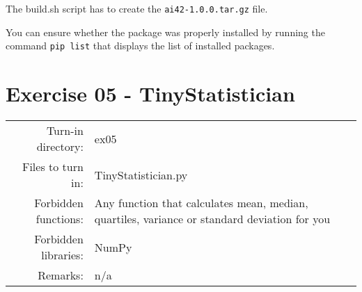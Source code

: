 \documentclass[]{article}
\begin{document}
The build.sh script has to create the \texttt{ai42-1.0.0.tar.gz} file.

You can ensure whether the package was properly installed by running the
command \texttt{pip\ list} that displays the list of installed packages.

\clearpage

\hypertarget{exercise-05---tinystatistician-1}{%
\section{Exercise 05 -
TinyStatistician}\label{exercise-05---tinystatistician-1}}

\begin{longtable}[]{@{}rl@{}}
\toprule
\endhead
\begin{minipage}[t]{0.54\columnwidth}\raggedleft
Turn-in directory:\strut
\end{minipage} & \begin{minipage}[t]{0.40\columnwidth}\raggedright
ex05\strut
\end{minipage}\tabularnewline
\begin{minipage}[t]{0.54\columnwidth}\raggedleft
Files to turn in:\strut
\end{minipage} & \begin{minipage}[t]{0.40\columnwidth}\raggedright
TinyStatistician.py\strut
\end{minipage}\tabularnewline
\begin{minipage}[t]{0.54\columnwidth}\raggedleft
Forbidden functions:\strut
\end{minipage} & \begin{minipage}[t]{0.40\columnwidth}\raggedright
Any function that calculates mean, median, quartiles, variance or
standard deviation for you\strut
\end{minipage}\tabularnewline
\begin{minipage}[t]{0.54\columnwidth}\raggedleft
Forbidden libraries:\strut
\end{minipage} & \begin{minipage}[t]{0.40\columnwidth}\raggedright
NumPy\strut
\end{minipage}\tabularnewline
\begin{minipage}[t]{0.54\columnwidth}\raggedleft
Remarks:\strut
\end{minipage} & \begin{minipage}[t]{0.40\columnwidth}\raggedright
n/a\strut
\end{minipage}\tabularnewline
\bottomrule
\end{longtable}
\end{document}
